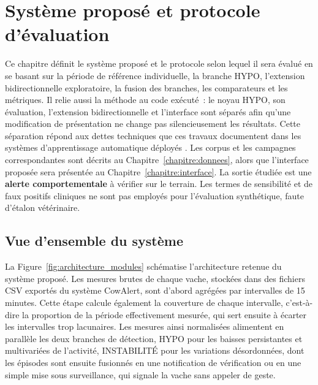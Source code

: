 \chapter{Système proposé et protocole d'évaluation}
\label{chapitre:systeme}

Ce chapitre définit le système proposé et le protocole selon lequel il sera évalué en se
basant sur la période de référence individuelle, la branche HYPO, l'extension bidirectionnelle
exploratoire, la fusion des branches, les comparateurs et les métriques. Il relie aussi la
méthode au code exécuté~: le noyau HYPO, son évaluation, l'extension bidirectionnelle et
l'interface sont séparés afin qu'une modification de présentation ne change pas
silencieusement les résultats. Cette séparation répond aux dettes techniques que ces
travaux documentent dans les systèmes d'apprentissage automatique déployés
\citep{sculley2015hidden,amershi2019software,breck2017ml}. Les corpus et les campagnes
correspondantes sont décrits au Chapitre~\ref{chapitre:donnees}, alors que l'interface
proposée sera présentée au Chapitre~\ref{chapitre:interface}. La sortie étudiée est une \textbf{alerte comportementale} à
vérifier sur le terrain. Les termes de sensibilité et de faux positifs cliniques ne sont pas
employés pour l'évaluation synthétique, faute d'étalon vétérinaire.

\section{Vue d'ensemble du système}
La Figure~\ref{fig:architecture_modules} schématise l'architecture retenue du système
proposé. Les mesures brutes de chaque vache, stockées dans des fichiers CSV exportés du
système CowAlert, sont d'abord agrégées par intervalles de 15 minutes. Cette étape
calcule également la couverture de chaque intervalle, c'est-à-dire la proportion de la
période effectivement mesurée, qui sert ensuite à écarter les intervalles trop lacunaires.
Les mesures ainsi normalisées alimentent en parallèle les deux branches de détection, HYPO
pour les baisses persistantes et multivariées de l'activité, INSTABILITÉ pour les variations
désordonnées, dont les épisodes sont ensuite fusionnés en une notification de vérification ou
en une simple mise sous surveillance, qui signale la vache sans appeler de geste.

